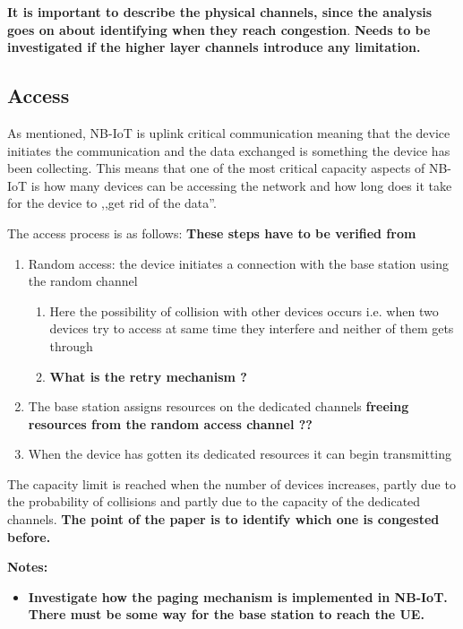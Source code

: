 \documentclass[10pt,a4paper,titlepage,twoside]{article}
\newcommand{\hh}[1]{\textbf{\color{ymaorng} #1}}
\newcommand{\point}[1]{\textbf{\color{ymared} #1}}
\begin{document}
\hh{It is important to describe the physical channels, since the analysis goes on about identifying when they reach congestion}. \point{Needs to be investigated if the higher layer channels introduce any limitation.}

\subsection{Access}

As mentioned, NB-IoT is uplink critical communication meaning that the device initiates the communication and the data exchanged is something the device has been collecting. This means that one of the most critical capacity aspects of NB-IoT is how many devices can be accessing the network and how long does it take for the device to ,,get rid of the data''.

The access process is as follows: \hh{These steps have to be verified from \cite{3gpp}}
\begin{enumerate}
  \item Random access: the device initiates a connection with the base station using the random channel
  \begin{enumerate}
    \item Here the possibility of collision with other devices occurs i.e. when two devices try to access at same time they interfere and neither of them gets through
    \item \hh{What is the retry mechanism ?}
  \end{enumerate}
  \item The base station assigns resources on the dedicated channels \point{freeing resources from the random access channel ??}
  \item When the device has gotten its dedicated resources it can begin transmitting
\end{enumerate}

The capacity limit is reached when the number of devices increases, partly due to the probability of collisions and partly due to the capacity of the dedicated channels. \hh{The point of the paper is to identify which one is congested before.}

\point{Notes:}\vspace{-4mm}
\begin{itemize}
  \item \hh{Investigate how the paging mechanism is implemented in NB-IoT. There must be some way for the base station to reach the UE.}
\end{itemize}
\end{document}
